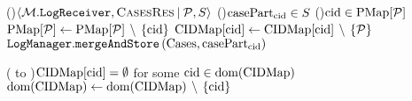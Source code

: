 \UponEv(){\upshape $\langle \mathcal{M}.\texttt{LogReceiver}, \textrm{\textsc{CasesRes}} \:|\: \mathcal{P}, S \rangle$ \SuchThat{$\LPrv \in \LPrvS$} \label{alg:CasesRes} }{
	\ForEach(){\upshape $\textrm{casePart}_{\textrm{cid}} \in S$}{%
		\If(){\upshape $\textrm{cid} \in \textrm{PMap}[\mathcal{P}]$}  {%
			$\textrm{PMap}[\mathcal{P}] \gets \textrm{PMap}[\mathcal{P}] \,\setminus\, \{\textrm{cid}\}$ 
			$\textrm{CIDMap}[\textrm{cid}] \gets \textrm{CIDMap}[\textrm{cid}] \,\setminus\, \{\mathcal{P}\}$ 
			$\texttt{LogManager}.\texttt{mergeAndStore}\left(\textrm{Cases}, \textrm{casePart}_{\textrm{cid}}\right)$ 
		}
	}
}

\Upon( to \SecM){\upshape $\textrm{CIDMap}[\textrm{cid}]= \emptyset$ for some $\textrm{cid} \in \textrm{dom}(\textrm{CIDMap})$} {%
	$\textrm{dom}(\textrm{CIDMap}) \gets \textrm{dom}(\textrm{CIDMap}) \,\setminus\, \{\textrm{cid}\}$\;
	\Yield{\upshape \CStor[\CId] \To{}}  
}

\endinput
UPON EVENT(M,CASERES|P,S) SUCH THAT P in \widehat{\mathcal{P}} DO
	for each C ∈ S:
		if C.cid ∈ PMap[P]
			CMap[C.cid]<--CMap[C.cid] ∪ {C}
			PMap[P]<-- PMap[P] \ {C.cid}
			CIDMap[C.cid]<-- CIDMap[C.cid] \ {P}


UPON |CIDMap[cid]|=0 such that cid in dom(CIDMap) //Computation phase start here.
merge all traces in CIDMap[cid] using mergingSchema and put it in mergedTrace
yeld PMAlgorithm(mergedTrace)
